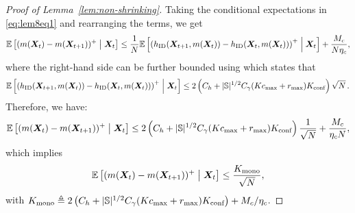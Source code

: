\begin{proof}[Proof of Lemma~\ref{lem:non-shrinking}]
    Taking the conditional expectations in \eqref{eq:lem8eq1} and rearranging the terms, we get
    \begin{align*}
       \mathbb{E}\left[(m({\bm{X}}_t)-m({\bm{X}}_{t+1}))^+\;\middle|\;{\bm{X}}_t\right]\leq \frac{1}{N}\mathbb{E}\left[\left(h_{\textnormal{ID}}({\bm{X}}_{t+1},m({\bm{X}}_t))-h_{\textnormal{ID}}({\bm{X}}_t,m({\bm{X}}_t))\right)^+\;\middle|\;{\bm{X}}_t\right] + \frac{M_c}{N\eta_c}, 
    \end{align*}
    where the right-hand side can be further bounded using  which states that
    \begin{align*}
        \mathbb{E}\left[\left(h_{\textnormal{ID}}({\bm{X}}_{t+1},m({\bm{X}}_t))-h_{\textnormal{ID}}({\bm{X}}_t,m({\bm{X}}_t))\right)^+\;\middle|\;{\bm{X}}_t\right]\leq 2\left(C_h+\lvert\mathbb{S}\rvert^{1/2} C_{\gamma}(Kc_{\max}+r_{\max})K_{\text{conf}}\right)\sqrt{N}\,.
    \end{align*}
    Therefore, we have:
    \begin{align*}
        \mathbb{E}\left[(m({\bm{X}}_t)-m({\bm{X}}_{t+1}))^+\;\middle|\;{\bm{X}}_t\right]\leq 2\left(C_h+\lvert\mathbb{S}\rvert^{1/2} C_{\gamma}(Kc_{\max}+r_{\max})K_{\text{conf}}\right)\frac{1}{\sqrt{N}}+\frac{M_c}{\eta_c N},
    \end{align*}
    which implies 
    \[
        \mathbb{E}\left[(m({\bm{X}}_t)-m({\bm{X}}_{t+1}))^+\;\middle|\;{\bm{X}}_t\right] \leq \frac{K_{\text{mono}}}{\sqrt{N}}, 
    \]
    with $K_{\text{mono}} \triangleq 2\left(C_h+\lvert\mathbb{S}\rvert^{1/2} C_{\gamma}(Kc_{\max}+r_{\max})K_{\text{conf}}\right) + M_c / \eta_c$. 
\end{proof}

